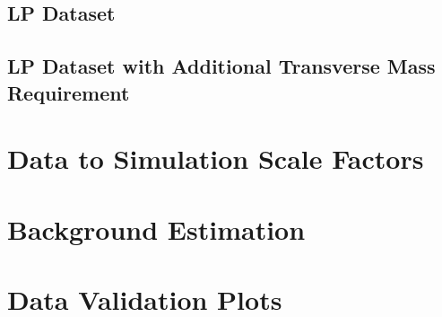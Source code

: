 \documentclass{cmspaper}
\begin{document}
%
\subsection{LP Dataset}


%
\subsection{LP Dataset with Additional Transverse Mass Requirement}



\clearpage
\section{Data to Simulation Scale Factors}


\section{Background Estimation}
\label{app:lp_bkgestim}


\section{Data Validation Plots}
\label{app:lp_postEPSdist}


\end{document}
